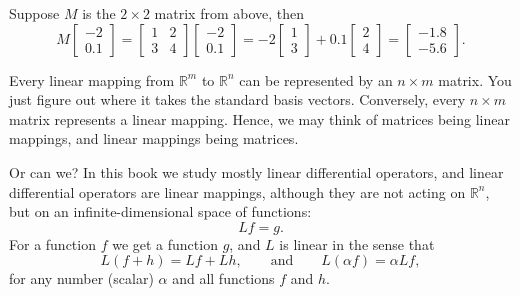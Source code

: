 Suppose $M$ is the $2 \times 2$ matrix from above,
then
\begin{equation*}
M
\begin{bmatrix}
-2 \\ 0.1
\end{bmatrix}
=
\begin{bmatrix}
1 & 2 \\
3 & 4
\end{bmatrix}
\begin{bmatrix}
-2 \\ 0.1
\end{bmatrix}
=
-2
\begin{bmatrix}
1 \\ 3
\end{bmatrix}
+
0.1
\begin{bmatrix}
2 \\ 4
\end{bmatrix}
=
\begin{bmatrix}
-1.8 \\ -5.6
\end{bmatrix} .
\end{equation*}

Every linear mapping from ${\mathbb R}^m$ to ${\mathbb R}^n$ can be
represented by an $n \times m$ matrix.  You just figure out where it
takes the standard basis vectors.  Conversely, every $n \times m$ matrix
represents a linear mapping.  Hence, we may think of matrices being
linear mappings, and linear mappings being matrices.

Or can we?  In this book we study mostly linear differential operators,
and linear differential operators are linear mappings, although they are
not acting on ${\mathbb R}^n$, but on
an infinite-dimensional space of functions:
\begin{equation*}
L f = g .
\end{equation*}
For a function $f$ we get a function $g$, and $L$ is linear in the sense that
\begin{equation*}
L ( f + h) = Lf + Lh, \qquad \text{and} \qquad
L (\alpha f) = \alpha Lf ,
\end{equation*}
for any number (scalar) $\alpha$ and all functions $f$ and $h$.

